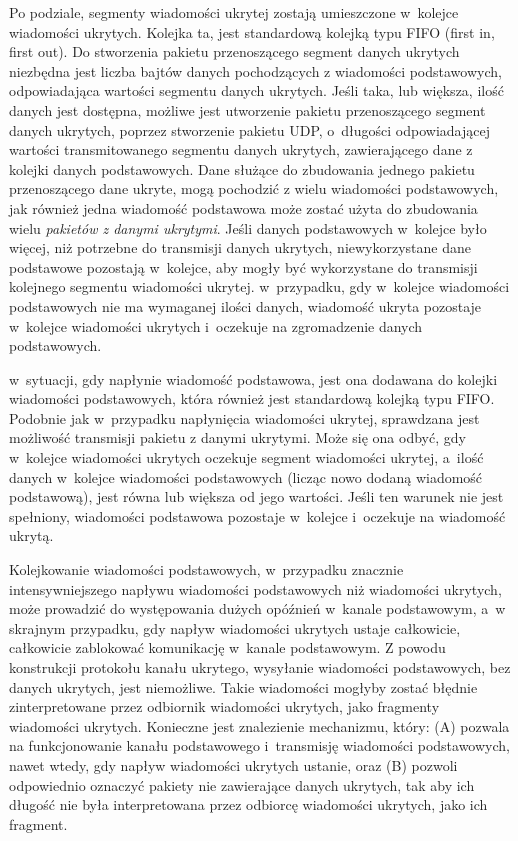 \documentclass[a4paper, twoside, 12pt]{report}
\begin{document}
    Po podziale, segmenty wiadomości ukrytej zostają umieszczone w~kolejce wiadomości
    ukrytych. Kolejka ta, jest standardową kolejką typu FIFO (first in, first out).
    Do stworzenia pakietu przenoszącego segment danych ukrytych niezbędna jest
    liczba bajtów danych pochodzących z wiadomości podstawowych, odpowiadająca
    wartości segmentu danych ukrytych. Jeśli taka, lub większa, ilość danych jest dostępna,
    możliwe jest utworzenie pakietu przenoszącego segment danych ukrytych, poprzez
    stworzenie pakietu UDP, o~długości odpowiadającej wartości transmitowanego segmentu danych
    ukrytych, zawierającego dane z kolejki danych podstawowych. Dane służące do zbudowania
    jednego pakietu przenoszącego dane ukryte, mogą pochodzić z wielu wiadomości
    podstawowych, jak również jedna wiadomość podstawowa może zostać użyta do zbudowania
    wielu \emph{pakietów z danymi ukrytymi}. Jeśli danych podstawowych
    w~kolejce było więcej, niż potrzebne do transmisji danych ukrytych, niewykorzystane
    dane podstawowe pozostają w~kolejce, aby mogły być wykorzystane do transmisji
    kolejnego segmentu wiadomości ukrytej.
    w~przypadku, gdy w~kolejce wiadomości podstawowych nie ma wymaganej ilości
    danych, wiadomość ukryta pozostaje w~kolejce wiadomości ukrytych i~oczekuje
    na zgromadzenie danych podstawowych.

    w~sytuacji, gdy napłynie wiadomość podstawowa, jest ona dodawana do kolejki
    wiadomości podstawowych, która również jest standardową kolejką typu FIFO.
    Podobnie jak w~przypadku napłynięcia wiadomości ukrytej, sprawdzana jest możliwość
    transmisji pakietu z danymi ukrytymi. Może się ona odbyć, gdy w~kolejce wiadomości
    ukrytych oczekuje segment wiadomości ukrytej, a~ilość danych w~kolejce wiadomości
    podstawowych (licząc nowo dodaną wiadomość podstawową), jest równa lub większa
    od jego wartości. Jeśli ten warunek nie jest spełniony, wiadomości podstawowa
    pozostaje w~kolejce i~oczekuje na wiadomość ukrytą.

    Kolejkowanie wiadomości podstawowych, w~przypadku znacznie intensywniejszego
    napływu wiadomości podstawowych niż wiadomości ukrytych, może prowadzić do
    występowania dużych opóźnień w~kanale podstawowym, a~w skrajnym przypadku,
    gdy napływ wiadomości ukrytych ustaje całkowicie, całkowicie zablokować
    komunikację w~kanale podstawowym. Z powodu konstrukcji protokołu kanału
    ukrytego, wysyłanie wiadomości podstawowych, bez danych ukrytych, jest niemożliwe.
    Takie wiadomości mogłyby zostać błędnie zinterpretowane przez odbiornik wiadomości
    ukrytych, jako fragmenty wiadomości ukrytych. Konieczne jest znalezienie mechanizmu,
    który: (A) pozwala na funkcjonowanie kanału podstawowego i~transmisję wiadomości
    podstawowych, nawet wtedy, gdy napływ wiadomości ukrytych ustanie, oraz (B)
    pozwoli odpowiednio oznaczyć pakiety nie zawierające danych ukrytych, tak aby ich długość
    nie była interpretowana przez odbiorcę wiadomości ukrytych, jako ich fragment.
\end{document}

